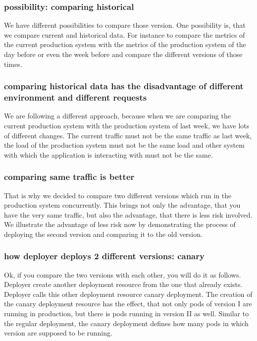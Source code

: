 \subsubsection{possibility: comparing historical}
We have different possibilities to compare those version. One possibility is, that we
compare current and historical data. For instance to compare the metrics of the current
production system with the metrics of the production system of the day before or even the
week before and compare the different versions of those times.

\subsubsection{comparing historical data has the disadvantage of different environment and
different requests}
We are following a different approach, because when we are comparing the current
production system with the production system of last week, we have lots of different
changes. The current traffic must not be the same traffic as last week, the load of the
production system must not be the same load and other system with which the application is
interacting with must not be the same.

\subsubsection{comparing same traffic is better}
That is why we decided to compare two different versions which run in the production
system concurrently. This brings not only the advantage, that you have the very same
traffic, but also the advantage, that there is less risk involved. We illustrate the
advantage of less risk now by demonstrating the process of deploying the second version
and comparing it to the old version.

\subsubsection{how deployer deploys 2 different versions: canary}
Ok, if you compare the two versions with each other, you will do it as follows. Deployer
create another deployment resource from the one that already exists. Deployer calls this
other deployment resource canary deployment. The creation of the canary deployment
resource has the effect, that not only pods of version I are running in production, but
there is pods running in version II as well. Similar to the regular deployment, the canary
deployment defines how many pods in which version are supposed to be running.

